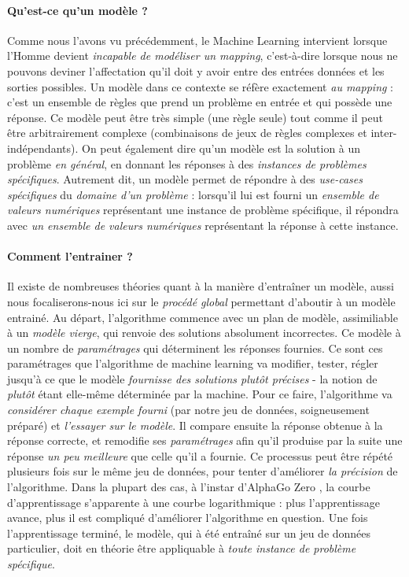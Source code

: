\paragraph{Qu'est-ce qu'un modèle ?} Comme nous l'avons vu précédemment, le Machine Learning intervient lorsque l'Homme devient \emph{incapable de modéliser un mapping},
c'est-à-dire lorsque nous ne pouvons deviner l'affectation qu'il doit y avoir entre des entrées données et les sorties possibles. Un modèle dans ce contexte se réfère 
exactement \emph{au mapping} : c'est un ensemble de règles que prend un problème en entrée et qui possède une réponse. Ce modèle peut être très simple (une règle seule)
tout comme il peut être arbitrairement complexe (combinaisons de jeux de règles complexes et inter-indépendants). On peut également dire qu'un modèle est la solution à un problème
\emph{en général}, en donnant les réponses à des \emph{instances de problèmes spécifiques}. Autrement dit, un modèle permet de répondre à des \emph{use-cases spécifiques} du
\emph{domaine d'un problème} \cite{MachineLearning3} : lorsqu'il lui est fourni un \emph{ensemble de valeurs numériques} représentant une instance de problème spécifique, il répondra
avec \emph{un ensemble de valeurs numériques} représentant la réponse à cette instance.

\paragraph{Comment l'entrainer ?} Il existe de nombreuses théories quant à la manière d'entraîner un modèle, aussi nous focaliserons-nous ici sur le \emph{procédé global}
permettant d'aboutir à un modèle entrainé. Au départ, l'algorithme commence avec un plan de modèle, assimiliable à un \emph{modèle vierge}, qui renvoie des solutions 
absolument incorrectes. Ce modèle à un nombre de \emph{paramétrages} qui déterminent les réponses fournies. Ce sont ces paramétrages que l'algorithme de machine learning va
modifier, tester, régler jusqu'à ce que le modèle \emph{fournisse des solutions plutôt précises} - la notion de \emph{plutôt} étant elle-même déterminée par la machine.
Pour ce faire, l'algorithme va \emph{considérer chaque exemple fourni} (par notre jeu de données, soigneusement préparé) et \emph{l'essayer sur le modèle}. Il compare ensuite
la réponse obtenue à la réponse correcte, et remodifie ses \emph{paramétrages} afin qu'il produise par la suite une réponse \emph{un peu meilleure} que celle qu'il a fournie.
Ce processus peut être répété plusieurs fois sur le même jeu de données, pour tenter d'améliorer \emph{la précision} de l'algorithme. Dans la plupart des cas, à l'instar d'AlphaGo
Zero \cite{AlphaGo2}, la courbe d'apprentissage s'apparente à une courbe logarithmique : plus l'apprentissage avance, plus il est compliqué d'améliorer l'algorithme en question.
Une fois l'apprentissage terminé, le modèle, qui à été entraîné sur un jeu de données particulier, doit en théorie être appliquable à \emph{toute instance de problème spécifique}.

